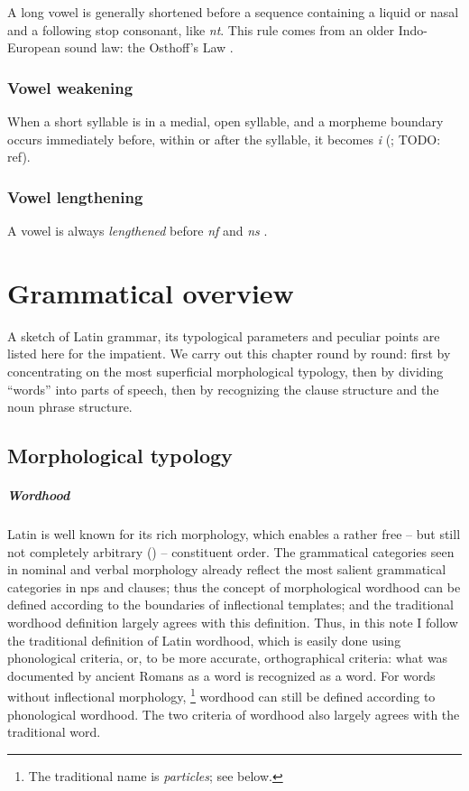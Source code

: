 \documentclass[a4paper, oneside, 12pt]{report}
\newcommand*{\citepage}[1]{p.~{#1}}
\newcommand*{\term}[1]{\emph{#1}}
\newcommand{\form}[1]{\emph{#1}}
\begin{document}
A long vowel is generally shortened before a sequence 
containing a liquid or nasal and a following stop consonant,
like \form{nt}.
This rule comes from an older Indo-European sound law: 
the Osthoff's Law
\citep[\citepage{55}]{oniga2014latin}.

\subsection{Vowel weakening}

When a short syllable is in a medial, open syllable,
and a morpheme boundary occurs immediately before, within or after the syllable,
it becomes \form{i} 
(\citealt[\citepage{55}]{oniga2014latin}; TODO: ref).

\subsection{Vowel lengthening}

A vowel is always \emph{lengthened} before \form{nf} and \form{ns}
\citep[\citepage{55}]{oniga2014latin}.

\chapter{Grammatical overview}

A sketch of Latin grammar, its typological parameters and peculiar points are listed here for the impatient.
We carry out this chapter round by round: 
first by concentrating on the most superficial morphological typology, 
then by dividing ``words'' into parts of speech, 
then by recognizing the clause structure and the noun phrase structure. 

\section{Morphological typology}

\paragraph*{Wordhood}

Latin is well known for its rich morphology,
which enables a rather free -- but still not completely arbitrary ()
-- constituent order.
The grammatical categories seen in nominal and verbal morphology 
already reflect the most salient grammatical categories
in \acs{np}s and clauses;
thus the concept of morphological wordhood can be defined according to 
the boundaries of inflectional templates;
and the traditional wordhood definition largely agrees with this definition. 
Thus, in this note I follow the traditional definition of Latin wordhood,
which is easily done using phonological criteria,
or, to be more accurate, orthographical criteria: 
what was documented by ancient Romans as a word 
is recognized as a word.
For words without inflectional morphology,%
\footnote{
    The traditional name is \term{particles};
    see below.
} 
wordhood can still be defined according to phonological wordhood.
The two criteria of wordhood also largely agrees with the traditional word.
\end{document}
